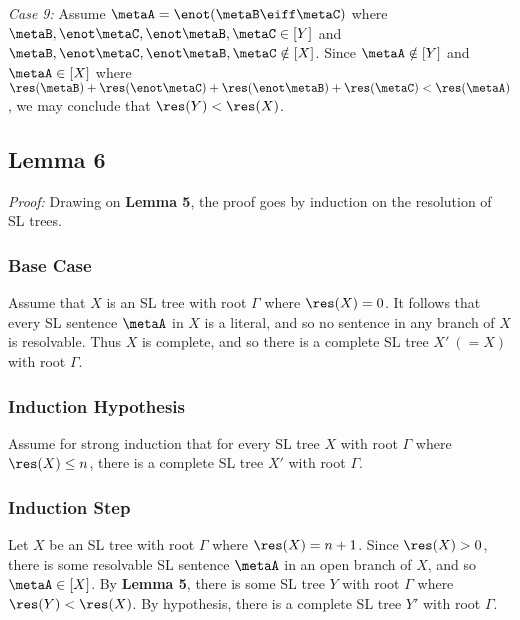 \textit{Case 9:}
Assume $\metaA=\enot(\metaB\eiff\metaC)$ where $\metaB,\enot\metaC,\enot\metaB,\metaC\in[Y]$ and $\metaB,\enot\metaC,\enot\metaB,\metaC\notin[X]$.
Since $\metaA\notin[Y]$ and $\metaA\in[X]$ where $\res(\metaB)+\res(\enot\metaC)+\res(\enot\metaB)+\res(\metaC)<\res(\metaA)$, we may conclude that $\res(Y)<\res(X)$.




\subsection{Lemma 6}

\label{CompleteTreeLemma}

\textit{Proof:}
Drawing on \textbf{Lemma 5}, the proof goes by induction on the resolution of SL trees.

\subsubsection{Base Case}

Assume that $X$ is an SL tree with root $\Gamma$ where $\res(X)=0$.
It follows that every SL sentence $\metaA$ in $X$ is a literal, and so no sentence in any branch of $X$ is resolvable. 
Thus $X$ is complete, and so there is a complete SL tree $X'\ (=X)$ with root $\Gamma$.


\subsubsection{Induction Hypothesis}

Assume for strong induction that for every SL tree $X$ with root $\Gamma$ where $\res(X)\leq n$, there is a complete SL tree $X'$ with root $\Gamma$.



\subsubsection{Induction Step}

Let $X$ be an SL tree with root $\Gamma$ where $\res(X)=n+1$.
Since $\res(X)>0$, there is some resolvable SL sentence $\metaA$ in an open branch of $X$, and so $\metaA \in [X]$. 
By \textbf{Lemma 5}, there is some SL tree $Y$ with root $\Gamma$ where $\res(Y)<\res(X)$.
By hypothesis, there is a complete SL tree $Y'$ with root $\Gamma$.




